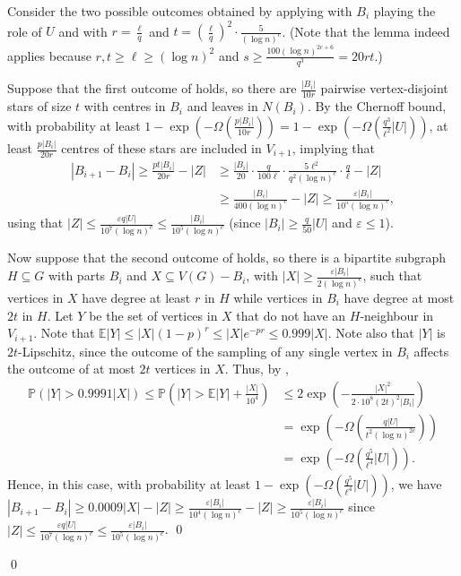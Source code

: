 \documentclass[10pt]{article}
\theoremstyle{plain}
\numberwithin{theorem}{section}
\theoremstyle{definition}
\theoremstyle{remark}
\renewenvironment{proof}[1][]{\begin{trivlist}
\item[\hspace{\labelsep}{\bf\noindent Proof#1.\/}] }{\qed\end{trivlist}}
\renewcommand{\setminus}{-}
\newcommand{\Ex}{\mathbb{E}}
\renewcommand{\Pr}{\mathbb{P}}
\newcommand{\eps}{\varepsilon}
\theoremstyle{plain}
\begin{document}
\begin{proof}
\begin{proof}
                Consider the two possible outcomes obtained by applying  with $B_i$ playing the role of $U$ and with $r= \frac{\ell}{q}$ and $t = \left(\frac{\ell}{q}\right)^2 \cdot \frac{5}{(\log n)^{c}}$. (Note that the lemma indeed applies because $r,t \ge \ell \ge (\log n)^{2}$ and $s \ge \frac{100 (\log n)^{2c+6}}{q^3} = 20rt$.)

				Suppose that the first outcome of  holds, so there are $\frac{|B_i|}{10r}$ pairwise vertex-disjoint stars of size $t$ with centres in $B_i$ and leaves in $N(B_i)$. 
				By the Chernoff bound, with probability at least $1 - \exp\left(-\Omega\left(\frac{p|B_i|}{10r}\right)\right) = 1 - \exp\left(-\Omega\left(\frac{q^3}{\ell^2}|U|\right)\right)$, at least $\frac{p|B_i|}{20r}$ centres of these stars are included in $V_{i+1}$, implying that
				\begin{align*}
					\left|B_{i+1} \setminus B_i\right| 
					\ge \frac{pt|B_i|}{20r} - |Z|
					& \ge \frac{|B_i|}{20} \cdot \frac{q}{100\ell} \cdot \frac{5\ell^2}{q^2 (\log n)^{c}} \cdot \frac{q}{\ell} - |Z| \\
					& \ge \frac{|B_i|}{400 (\log n)^{c}}- |Z|
					\ge \frac{\eps|B_i|}{10^5 (\log n)^{c}},
				\end{align*}
				using that $|Z| \le \frac{\eps q |U|}{10^7 (\log n)^{c}} \le \frac{ |B_i|}{10^5 (\log n)^{c}}$ (since  $|B_i| \ge \frac{q}{50}|U|$ and $\eps \le 1$).

				Now suppose that the second outcome of  holds, so there is a bipartite subgraph $H \subseteq G$ with parts $B_i$ and $X \subseteq V(G) \setminus B_i$, with $|X| \ge \frac{\eps|B_i|}{2 (\log n)^{c}}$, such that vertices in $X$ have degree at least $r$ in $H$ while vertices in $B_i$ have degree at most $2t$ in $H$.
				Let $Y$ be the set of vertices in $X$ that do not have an $H$-neighbour in $V_{i+1}$. Note that $\Ex |Y| \le |X| (1 - p)^r \le |X| e^{-pr} \le 0.999 |X|$. Note also that $|Y|$ is $2t$-Lipschitz, since the outcome of the sampling of any single vertex in $B_i$ affects the outcome of at most $2t$ vertices in $X$. Thus, by ,
				\begin{align*}
					\Pr\left(|Y| > 0.9991|X|\right) \le \Pr\left(|Y| > \Ex |Y| + \frac{|X|}{10^4}\right)
					& \le 2\exp\left(-\frac{|X|^2}{2 \cdot 10^8 (2t)^2|B_i|}\right) \\
					& = \exp\left(-\Omega\left(\frac{q|U|}{t^{2} (\log n)^{2c}}\right)\right) \\
					& = \exp\left(-\Omega\left( \frac{q^5}{\ell^4}|U| \right)\right).
				\end{align*}
				Hence, in this case, with probability at least $1 - \exp\left(-\Omega\left( \frac{q^5}{\ell^4}|U| \right)\right)$, we have $|B_{i+1} \setminus B_i| \ge 0.0009 |X| - |Z| \ge \frac{\eps|B_i|}{10^4(\log n)^c} - |Z| \ge \frac{\eps|B_i|}{10^5 (\log n)^{c}}$ since $|Z| \le \frac{\eps q |U|}{10^7(\log n)^{c}} \le \frac{\eps |B_i|}{10^5 (\log n)^{c}}$.
			\end{proof}


\end{proof}
\end{document}
